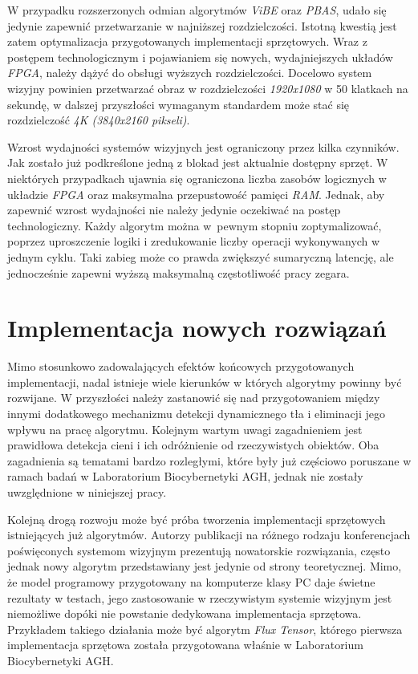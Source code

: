 W przypadku rozszerzonych odmian algorytmów \textit{ViBE} oraz \textit{PBAS}, udało się jedynie zapewnić przetwarzanie w najniższej rozdzielczości.
Istotną kwestią jest zatem optymalizacja przygotowanych implementacji sprzętowych. 
Wraz z postępem technologicznym i pojawianiem się nowych, wydajniejszych układów \textit{FPGA}, należy dążyć do obsługi wyższych rozdzielczości.
Docelowo system wizyjny powinien przetwarzać obraz w rozdzielczości \textit{1920x1080} w 50 klatkach na sekundę, w dalszej przyszłości wymaganym standardem może stać się rozdzielczość \textit{4K (3840x2160 pikseli)}.

Wzrost wydajności systemów wizyjnych jest ograniczony przez kilka czynników. 
Jak zostało już podkreślone jedną z blokad jest aktualnie dostępny sprzęt. %
W niektórych przypadkach ujawnia się ograniczona liczba zasobów logicznych w układzie \textit{FPGA} oraz maksymalna przepustowość pamięci \textit{RAM}. Jednak, aby zapewnić wzrost wydajności nie należy jedynie oczekiwać na postęp technologiczny. Każdy algorytm można w~pewnym stopniu zoptymalizować, poprzez uproszczenie logiki i zredukowanie liczby operacji wykonywanych w jednym cyklu. Taki zabieg może co prawda zwiększyć sumaryczną latencję, ale jednocześnie zapewni wyższą maksymalną częstotliwość pracy zegara. 


\section{Implementacja nowych rozwiązań}
\label{sec:implementacja_nowych_rozwiazan}

Mimo stosunkowo zadowalających efektów końcowych przygotowanych implementacji, nadal istnieje wiele kierunków w których algorytmy powinny być rozwijane. 
W przyszłości należy zastanowić się nad przygotowaniem między innymi dodatkowego mechanizmu detekcji dynamicznego tła i eliminacji jego wpływu na pracę algorytmu. 
Kolejnym wartym uwagi zagadnieniem jest prawidłowa detekcja cieni i ich odróżnienie od rzeczywistych obiektów. 
Oba zagadnienia są tematami bardzo rozległymi, które były już częściowo poruszane w ramach badań w Laboratorium Biocybernetyki AGH, jednak nie zostały uwzględnione w niniejszej pracy.

Kolejną drogą rozwoju może być próba tworzenia implementacji sprzętowych istniejących już algorytmów. 
Autorzy publikacji na różnego rodzaju konferencjach poświęconych systemom wizyjnym prezentują nowatorskie rozwiązania, często jednak nowy algorytm przedstawiany jest jedynie od strony teoretycznej. 
Mimo, że model programowy przygotowany na komputerze klasy PC daje świetne rezultaty w testach, jego zastosowanie w rzeczywistym systemie wizyjnym jest niemożliwe dopóki nie powstanie dedykowana implementacja sprzętowa. 
Przykładem takiego działania może być algorytm \textit{Flux Tensor}, którego pierwsza implementacja sprzętowa \cite{janus_16_flux} została przygotowana właśnie w Laboratorium Biocybernetyki AGH.